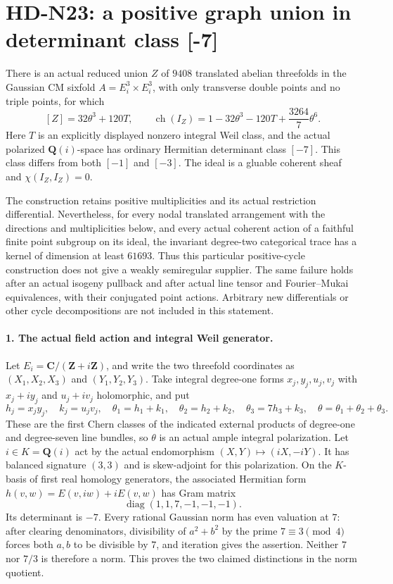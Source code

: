 \section{HD-N23: a positive graph union in determinant class [-7]}
\label{sec:positive-graph-union}

There is an actual reduced union $Z$ of $9408$ translated abelian
threefolds in the Gaussian CM sixfold $A=E_i^3\times E_i^3$, with
only transverse double points and no triple points, for which
\[
 [Z]=32\theta^3+120T,\qquad
 \operatorname{ch}(I_Z)
   =1-32\theta^3-120T+\frac{3264}{7}\theta^6.                 \tag{N23.1}
\]
Here $T$ is an explicitly displayed nonzero integral Weil class,
and the actual polarized $\mathbf Q(i)$-space has ordinary
Hermitian determinant class $[-7]$. This class differs from both
$[-1]$ and $[-3]$. The ideal is a gluable coherent sheaf and
$\chi(I_Z,I_Z)=0$.

The construction retains positive multiplicities and its actual
restriction differential. Nevertheless, for every nodal translated
arrangement with the directions and multiplicities below, and every
actual coherent action of a faithful finite point subgroup on its
ideal, the invariant degree-two categorical trace has a kernel of
dimension at least $61693$. Thus this particular positive-cycle
construction does not give a weakly semiregular supplier. The same
failure holds after an actual isogeny pullback and after actual line
tensor and Fourier--Mukai equivalences, with their conjugated point
actions. Arbitrary new differentials or other cycle decompositions
are not included in this statement.

\paragraph{1. The actual field action and integral Weil generator.}
Let $E_i=\mathbf C/(\mathbf Z+i\mathbf Z)$, and write the two
threefold coordinates as $(X_1,X_2,X_3)$ and $(Y_1,Y_2,Y_3)$.
Take integral degree-one forms $x_j,y_j,u_j,v_j$ with
$x_j+i y_j$ and $u_j+i v_j$ holomorphic, and put
\[
 h_j=x_jy_j,\quad k_j=u_jv_j,\quad
 \theta_1=h_1+k_1,\quad\theta_2=h_2+k_2,\quad
 \theta_3=7h_3+k_3,\quad\theta=\theta_1+\theta_2+\theta_3.
                                                               \tag{N23.2}
\]
These are the first Chern classes of the indicated external
products of degree-one and degree-seven line bundles, so $\theta$
is an actual ample integral polarization. Let $i\in K=\mathbf Q(i)$
act by the actual endomorphism $(X,Y)\mapsto(iX,-iY)$.
It has balanced signature $(3,3)$ and is skew-adjoint for this
polarization. On the $K$-basis of first real homology generators,
the associated Hermitian form
$h(v,w)=E(v,iw)+iE(v,w)$ has Gram matrix
\[
                  \operatorname{diag}(1,1,7,-1,-1,-1).       \tag{N23.3}
\]
Its determinant is $-7$. Every rational Gaussian norm has even
valuation at $7$: after clearing denominators, divisibility of
$a^2+b^2$ by the prime $7\equiv3\pmod4$ forces both $a,b$
to be divisible by $7$, and iteration gives the assertion.
Neither $7$ nor $7/3$ is therefore a norm. This proves the two
claimed distinctions in the norm quotient.

